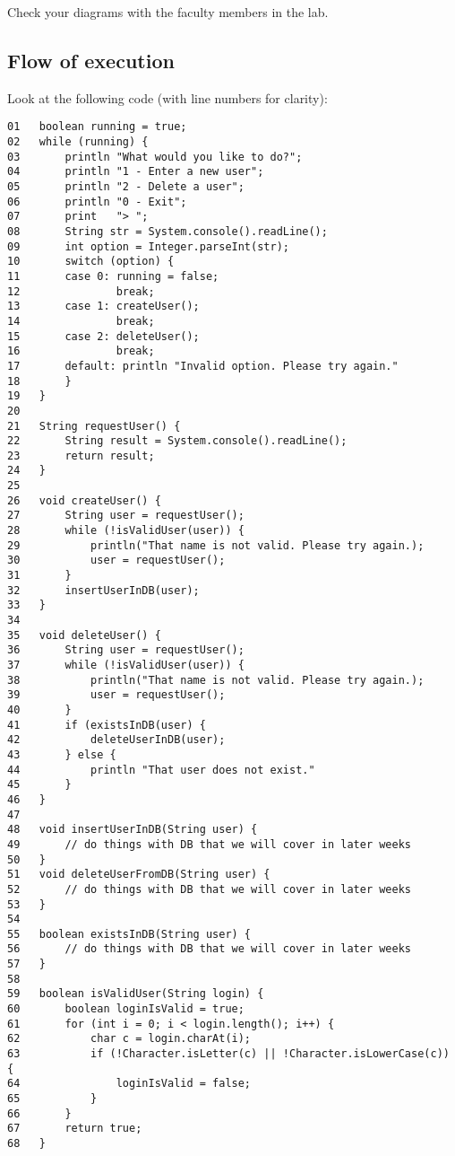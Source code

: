 \documentclass{article}
\begin{document}
Check your diagrams with the faculty members in the lab. 

\subsection{Flow of execution}
\label{sec:flow-execution}

Look at the following code (with line numbers for clarity): 

\begin{verbatim}
01   boolean running = true;
02   while (running) { 
03       println "What would you like to do?";
04       println "1 - Enter a new user";
05       println "2 - Delete a user";
06       println "0 - Exit";
07       print   "> ";
08       String str = System.console().readLine();
09       int option = Integer.parseInt(str);
10       switch (option) {
11       case 0: running = false;
12               break;
13       case 1: createUser();
14               break;
15       case 2: deleteUser();
16               break;
17       default: println "Invalid option. Please try again."
18       }
19   }
20
21   String requestUser() {
22       String result = System.console().readLine();
23       return result;
24   }
25   
26   void createUser() {
27       String user = requestUser();
28       while (!isValidUser(user)) {
29           println("That name is not valid. Please try again.);
30           user = requestUser();
31       }
32       insertUserInDB(user);
33   }
34   
35   void deleteUser() {
36       String user = requestUser();
37       while (!isValidUser(user)) {
38           println("That name is not valid. Please try again.);
39           user = requestUser();
40       }
41       if (existsInDB(user) {
42           deleteUserInDB(user);
43       } else {
44           println "That user does not exist."
45       }
46   }
47   
48   void insertUserInDB(String user) {
49       // do things with DB that we will cover in later weeks
50   }  
51   void deleteUserFromDB(String user) {
52       // do things with DB that we will cover in later weeks
53   }
54   
55   boolean existsInDB(String user) {
56       // do things with DB that we will cover in later weeks
57   }
58   
59   boolean isValidUser(String login) {
60       boolean loginIsValid = true;
61       for (int i = 0; i < login.length(); i++) {
62           char c = login.charAt(i);
63           if (!Character.isLetter(c) || !Character.isLowerCase(c)) {
64               loginIsValid = false;
65           }
66       }
67       return true;
68   }
\end{verbatim}
\end{document}
